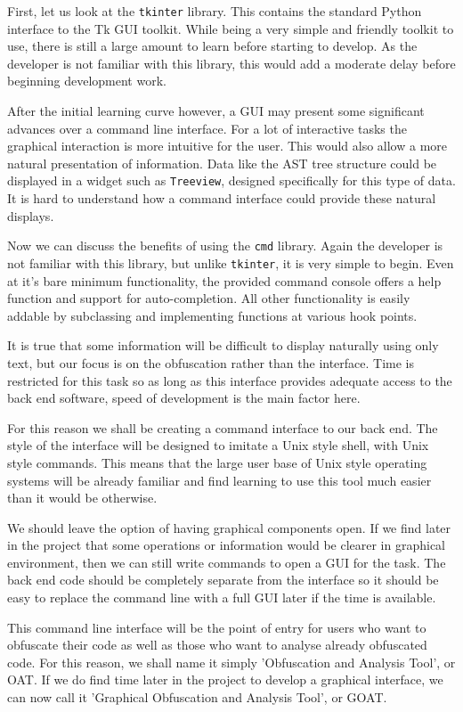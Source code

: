 \documentclass[twoside,a4paper]{report}
\begin{document}
First, let us look at the \texttt{tkinter} library. This contains the standard Python interface to the Tk GUI toolkit. While being
a very simple and friendly toolkit to use, there is still a large amount to learn before starting to develop. As the developer is
not familiar with this library, this would add a moderate delay before beginning development work.

After the initial learning curve however, a GUI may present some significant advances over a command line interface. For a lot of interactive
tasks the graphical interaction is more intuitive for the user. This would also allow a more natural presentation of information. Data like
the AST tree structure could be displayed in a widget such as \texttt{Treeview}, designed specifically for this type of data. It is hard to
understand how a command interface could provide these natural displays.

Now we can discuss the benefits of using the \texttt{cmd} library. Again the developer is not familiar with this library, but unlike
\texttt{tkinter}, it is very simple to begin. Even at it's bare minimum functionality, the provided command console offers a help
function and support for auto-completion. All other functionality is easily addable by subclassing and implementing functions at various
hook points.

It is true that some information will be difficult to display naturally using only text, but our focus is on the obfuscation rather than
the interface. Time is restricted for this task so as long as this interface provides adequate access to the back end software, speed
of development is the main factor here.

For this reason we shall be creating a command interface to our back end. The style of the interface will be designed to imitate a
Unix style shell, with Unix style commands. This means that the large user base of Unix style operating systems will be already familiar
and find learning to use this tool much easier than it would be otherwise.

We should leave the option of having graphical components open. If we find later in the project that some operations or information would
be clearer in graphical environment, then we can still write commands to open a GUI for the task. The back end code should be completely
separate from the interface so it should be easy to replace the command line with a full GUI later if the time is available.

This command line interface will be the point of entry for users who want to obfuscate their code as well as those who want to analyse
already obfuscated code. For this reason, we shall name it simply 'Obfuscation and Analysis Tool', or OAT. If we do find time later in
the project to develop a graphical interface, we can now call it 'Graphical Obfuscation and Analysis Tool', or GOAT.
\end{document}
